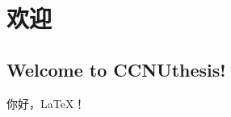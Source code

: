 \documentclass{CCNUthesis}
\begin{document}
\chapter{欢迎}

\section{Welcome to CCNUthesis!}

你好，\LaTeX{}！
\end{document}
